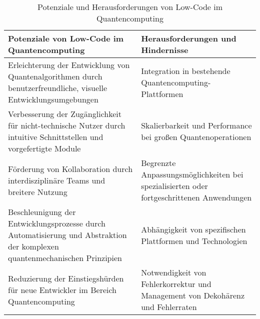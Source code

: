 \begin{table}[h!]
    \centering
    \begin{tabular}{|p{7cm}|p{7cm}|}
    \hline
    \textbf{Potenziale von Low-Code im Quantencomputing} & \textbf{Herausforderungen und Hindernisse} \\
    \hline
    Erleichterung der Entwicklung von Quantenalgorithmen durch benutzerfreundliche, visuelle Entwicklungsumgebungen & Integration in bestehende Quantencomputing-Plattformen \\
    \hline
    Verbesserung der Zugänglichkeit für nicht-technische Nutzer durch intuitive Schnittstellen und vorgefertigte Module & Skalierbarkeit und Performance bei großen Quantenoperationen \\
    \hline
    Förderung von Kollaboration durch interdisziplinäre Teams und breitere Nutzung & Begrenzte Anpassungsmöglichkeiten bei spezialisierten oder fortgeschrittenen Anwendungen \\
    \hline
    Beschleunigung der Entwicklungsprozesse durch Automatisierung und Abstraktion der komplexen quantenmechanischen Prinzipien & Abhängigkeit von spezifischen Plattformen und Technologien \\
    \hline
    Reduzierung der Einstiegshürden für neue Entwickler im Bereich Quantencomputing & Notwendigkeit von Fehlerkorrektur und Management von Dekohärenz und Fehlerraten \\
    \hline
    \end{tabular}
    \caption{Potenziale und Herausforderungen von Low-Code im Quantencomputing}
    \label{tab:lowcode_potentials_challenges}
\end{table}